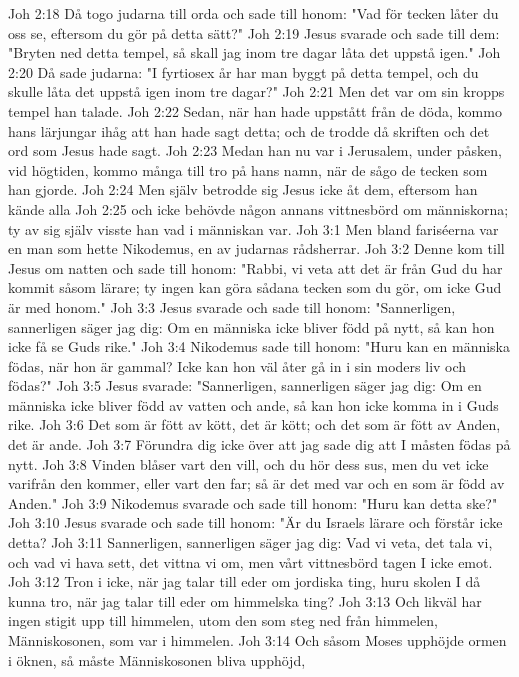 Joh 2:18  Då togo judarna till orda och sade till honom: "Vad för tecken låter du oss se, eftersom du gör på detta sätt?"
Joh 2:19  Jesus svarade och sade till dem: "Bryten ned detta tempel, så skall jag inom tre dagar låta det uppstå igen."
Joh 2:20  Då sade judarna: "I fyrtiosex år har man byggt på detta tempel, och du skulle låta det uppstå igen inom tre dagar?"
Joh 2:21  Men det var om sin kropps tempel han talade.
Joh 2:22  Sedan, när han hade uppstått från de döda, kommo hans lärjungar ihåg att han hade sagt detta; och de trodde då skriften och det ord som Jesus hade sagt.
Joh 2:23  Medan han nu var i Jerusalem, under påsken, vid högtiden, kommo många till tro på hans namn, när de sågo de tecken som han gjorde.
Joh 2:24  Men själv betrodde sig Jesus icke åt dem, eftersom han kände alla
Joh 2:25  och icke behövde någon annans vittnesbörd om människorna; ty av sig själv visste han vad i människan var.
Joh 3:1  Men bland fariséerna var en man som hette Nikodemus, en av judarnas rådsherrar.
Joh 3:2  Denne kom till Jesus om natten och sade till honom: "Rabbi, vi veta att det är från Gud du har kommit såsom lärare; ty ingen kan göra sådana tecken som du gör, om icke Gud är med honom."
Joh 3:3  Jesus svarade och sade till honom: "Sannerligen, sannerligen säger jag dig: Om en människa icke bliver född på nytt, så kan hon icke få se Guds rike."
Joh 3:4  Nikodemus sade till honom: "Huru kan en människa födas, när hon är gammal? Icke kan hon väl åter gå in i sin moders liv och födas?"
Joh 3:5  Jesus svarade: "Sannerligen, sannerligen säger jag dig: Om en människa icke bliver född av vatten och ande, så kan hon icke komma in i Guds rike.
Joh 3:6  Det som är fött av kött, det är kött; och det som är fött av Anden, det är ande.
Joh 3:7  Förundra dig icke över att jag sade dig att I måsten födas på nytt.
Joh 3:8  Vinden blåser vart den vill, och du hör dess sus, men du vet icke varifrån den kommer, eller vart den far; så är det med var och en som är född av Anden."
Joh 3:9  Nikodemus svarade och sade till honom: "Huru kan detta ske?"
Joh 3:10  Jesus svarade och sade till honom: "Är du Israels lärare och förstår icke detta?
Joh 3:11  Sannerligen, sannerligen säger jag dig: Vad vi veta, det tala vi, och vad vi hava sett, det vittna vi om, men vårt vittnesbörd tagen I icke emot.
Joh 3:12  Tron i icke, när jag talar till eder om jordiska ting, huru skolen I då kunna tro, när jag talar till eder om himmelska ting?
Joh 3:13  Och likväl har ingen stigit upp till himmelen, utom den som steg ned från himmelen, Människosonen, som var i himmelen.
Joh 3:14  Och såsom Moses upphöjde ormen i öknen, så måste Människosonen bliva upphöjd,
